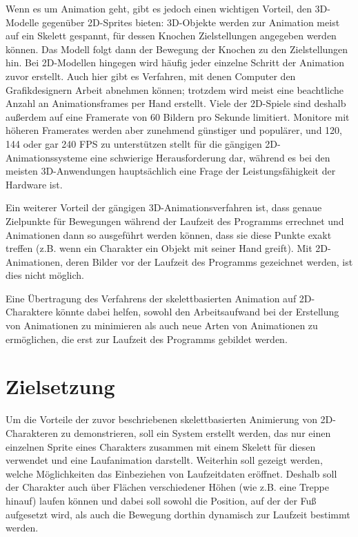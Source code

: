 Wenn es um Animation geht, gibt es jedoch einen wichtigen Vorteil, den 3D-Modelle gegenüber 2D-Sprites bieten: 3D-Objekte werden zur Animation meist auf ein Skelett gespannt, für dessen Knochen Zielstellungen angegeben werden können. Das Modell folgt dann der Bewegung der Knochen zu den Zielstellungen hin. Bei 2D-Modellen hingegen wird häufig jeder einzelne Schritt der Animation zuvor erstellt. Auch hier gibt es Verfahren, mit denen Computer den Grafikdesignern Arbeit abnehmen können; trotzdem wird meist eine beachtliche Anzahl an Animationsframes per Hand erstellt. Viele der 2D-Spiele sind deshalb außerdem auf eine Framerate von 60 Bildern pro Sekunde limitiert. Monitore mit höheren Framerates werden aber zunehmend günstiger und populärer, und 120, 144 oder gar 240 FPS zu unterstützen stellt für die gängigen 2D-Animationssysteme eine schwierige Herausforderung dar, während es bei den meisten 3D-Anwendungen hauptsächlich eine Frage der Leistungsfähigkeit der Hardware ist.

Ein weiterer Vorteil der gängigen 3D-Animationsverfahren ist, dass genaue Zielpunkte für Bewegungen während der Laufzeit des Programms errechnet und Animationen dann so ausgeführt werden können, dass sie diese Punkte exakt treffen (z.B. wenn ein Charakter ein Objekt mit seiner Hand greift). Mit 2D-Animationen, deren Bilder vor der Laufzeit des Programms gezeichnet werden, ist dies nicht möglich.

Eine Übertragung des Verfahrens der skelettbasierten Animation auf 2D-Charaktere könnte dabei helfen, sowohl den Arbeitsaufwand bei der Erstellung von Animationen zu minimieren als auch neue Arten von Animationen zu ermöglichen, die erst zur Laufzeit des Programms gebildet werden.

\section{Zielsetzung}
Um die Vorteile der zuvor beschriebenen skelettbasierten Animierung von 2D-Charakteren zu demonstrieren, soll ein System erstellt werden, das nur einen einzelnen Sprite eines Charakters zusammen mit einem Skelett für diesen verwendet und eine Laufanimation darstellt. Weiterhin soll gezeigt werden, welche Möglichkeiten das Einbeziehen von Laufzeitdaten eröffnet. Deshalb soll der Charakter auch über Flächen verschiedener Höhen (wie z.B. eine Treppe hinauf) laufen können und dabei soll sowohl die Position, auf der der Fuß aufgesetzt wird, als auch die Bewegung dorthin dynamisch zur Laufzeit bestimmt werden.

